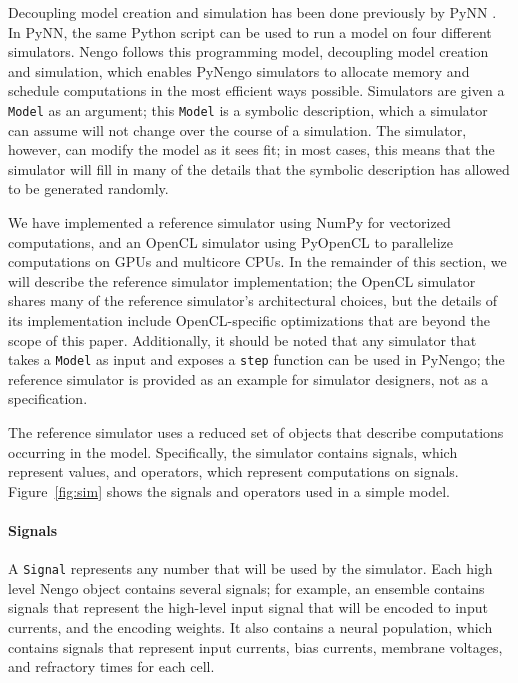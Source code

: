 \documentclass{frontiersSCNS}
\begin{document}
Decoupling model creation and simulation
has been done previously
by PyNN \cite{TODO}.
In PyNN, the same Python script
can be used to run a model
on four different simulators.
Nengo follows this programming model,
decoupling model creation and simulation,
which enables PyNengo simulators
to allocate memory and schedule computations
in the most efficient ways possible.
Simulators are given a \texttt{Model}
as an argument;
this \texttt{Model} is a symbolic description,
which a simulator can assume will not change
over the course of a simulation.
The simulator, however,
can modify the model as it sees fit;
in most cases, this means that the simulator
will fill in many of the details
that the symbolic description
has allowed to be generated randomly.

We have implemented
a reference simulator using NumPy
for vectorized computations,
and an OpenCL simulator
using PyOpenCL to parallelize
computations on GPUs and multicore CPUs.
In the remainder of this section,
we will describe
the reference simulator implementation;
the OpenCL simulator shares many
of the reference simulator's architectural choices,
but the details of its implementation
include OpenCL-specific optimizations
that are beyond the scope of this paper.
Additionally, it should be noted that
any simulator that takes a \texttt{Model}
as input and exposes a \texttt{step}
function can be used in PyNengo;
the reference simulator
is provided as an example
for simulator designers,
not as a specification.

The reference simulator
uses a reduced set of objects
that describe computations
occurring in the model.
Specifically, the simulator
contains signals, which represent values,
and operators, which represent computations
on signals.
Figure~\ref{fig:sim} shows the signals
and operators used in a simple model.

\paragraph{Signals}

A \texttt{Signal} represents any number that
will be used by the simulator.
Each high level Nengo object contains
several signals;
for example, an ensemble contains signals
that represent the high-level input
signal that will be encoded
to input currents,
and the encoding weights.
It also contains a neural population,
which contains signals that represent
input currents, bias currents,
membrane voltages, and refractory times for each cell.
\end{document}

